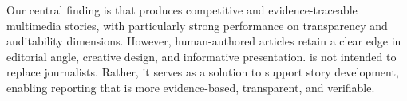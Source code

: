 {%
Our central finding is that \methodshort{} produces competitive and evidence-traceable multimedia stories, with particularly strong performance on transparency and auditability dimensions.
However, human-authored articles retain a clear edge in editorial angle, creative design, and informative presentation.
 \methodshort{} is not intended to replace journalists. Rather, it serves as a solution to support story development, enabling reporting that is more evidence-based, transparent, and verifiable. 
}